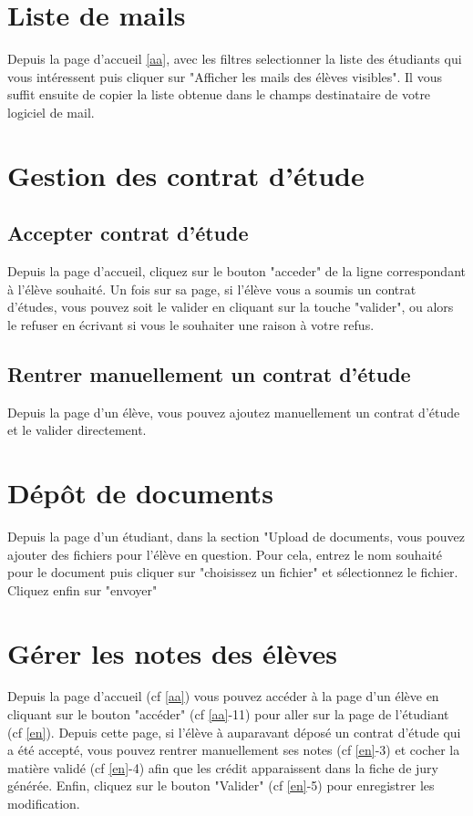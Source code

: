 \section{Liste de mails}

Depuis la page d'accueil \ref{aa}, avec les filtres selectionner la liste des étudiants qui vous intéressent puis cliquer sur "Afficher les mails des élèves visibles". Il vous suffit ensuite de copier la liste obtenue dans le champs destinataire de votre logiciel de mail.

\section{Gestion des contrat d'étude}

\subsection{Accepter contrat d'étude}
Depuis la page d'accueil, cliquez sur le bouton "acceder" de la ligne correspondant à l'élève souhaité. Un fois sur sa page, si l'élève vous a soumis un contrat d'études, vous pouvez soit le valider en cliquant sur la touche "valider", ou alors le refuser en écrivant si vous le souhaiter une raison à votre refus.

\subsection{Rentrer manuellement un contrat d'étude}
Depuis la page d'un élève, vous pouvez ajoutez manuellement un contrat d'étude et le valider directement.

\section{Dépôt de documents}

Depuis la page d'un étudiant, dans la section "Upload de documents, vous pouvez ajouter des fichiers pour l'élève en question. Pour cela, entrez le nom souhaité pour le document puis cliquer sur "choisissez un fichier" et sélectionnez le fichier. Cliquez enfin sur "envoyer" 

\section{Gérer les notes des élèves}

Depuis la page d'accueil (cf \ref{aa}) vous pouvez accéder à la page d'un élève en cliquant sur le bouton "accéder" (cf \ref{aa}-11) pour aller sur la page de l'étudiant (cf \ref{en}). Depuis cette page, si l'élève à auparavant déposé un contrat d'étude qui a été accepté, vous pouvez rentrer manuellement ses notes (cf \ref{en}-3) et cocher la matière validé (cf \ref{en}-4) afin que les crédit apparaissent dans la fiche de jury générée. Enfin, cliquez sur le bouton "Valider" (cf \ref{en}-5) pour enregistrer les modification.


